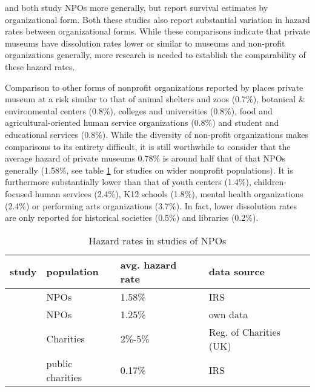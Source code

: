 \documentclass[12pt]{article}
\begin{document}
\textcite{Hager_2001_vulnerability} and \textcite{Gordon_etal_2013_insolvency} both study NPOs more generally, but report survival estimates by organizational form.
Both these studies also report substantial variation in hazard rates between organizational forms.
While these comparisons indicate that private museums have dissolution rates lower or similar to museums and non-profit organizations generally, more research is needed to establish the comparability of these hazard rates.


Comparison to other forms of nonprofit organizations reported by \parencite{Gordon_etal_2013_insolvency}
places private museum at a risk similar to that of animal shelters and zoos (0.7\%), botanical \& environmental centers (0.8\%), colleges and universities (0.8\%), food and agricultural-oriented human service organizations (0.8\%) and  student and educational services (0.8\%).
While the diversity of non-profit organizations makes comparisons to its entirety difficult, it is still worthwhile to consider that the average hazard of private museums 0.78\% is around half that of that NPOs generally (1.58\%, see table \ref{tbl:litreview2} for studies on wider nonprofit populations).
It is furthermore substantially lower than that of youth centers (1.4\%), children-focused human services (2.4\%), K12 schools (1.8\%), mental health organizations (2.4\%) or performing arts organizations (3.7\%).
In fact, lower dissolution rates are only reported for historical societies (0.5\%) and libraries (0.2\%).



\begin{table}[htbp]
\caption{\label{tbl:litreview2}Hazard rates in studies of NPOs}
\centering
\begin{tabular}{llll}
\hline
study & population & avg. hazard rate & data source\\
\hline
\cite{Gordon_etal_2013_insolvency} & NPOs & 1.58\% & IRS\\
\cite{Hager_Galaskiewicz_Larson_2007_liability} & NPOs & 1.25\% & own data\\
\cite{Clifford_2018_reinforcing} & Charities & 2\%-5\% & Reg. of Charities (UK)\\
\cite{Mayer_2022_slimmer} & public charities & 0.17\% & IRS\\
\hline
\end{tabular}
\end{table}
\end{document}
